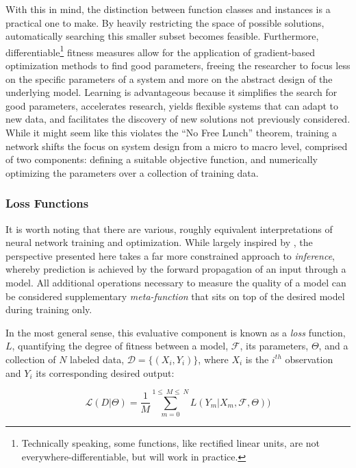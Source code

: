 With this in mind, the distinction between function classes and instances is a practical one to make.
By heavily restricting the space of possible solutions, automatically searching this smaller subset becomes feasible.
Furthermore, differentiable\footnote{Technically speaking, some functions, like rectified linear units, are not everywhere-differentiable, but will work in practice.} fitness measures allow for the application of gradient-based optimization methods to find good parameters, freeing the researcher to focus less on the specific parameters of a system and more on the abstract design of the underlying model.
Learning is advantageous because it simplifies the search for good parameters, accelerates research, yields flexible systems that can adapt to new data, and facilitates the discovery of new solutions not previously considered.
While it might seem like this violates the ``No Free Lunch'' theorem, training a network shifts the focus on system design from a micro to macro level, comprised of two components: defining a suitable objective function, and numerically optimizing the parameters over a collection of training data.


\subsubsection{Loss Functions}

It is worth noting that there are various, roughly equivalent interpretations of neural network training and optimization.
While largely inspired by \cite{LeCun2006Tutorial}, the perspective presented here takes a far more constrained approach to \emph{inference}, whereby prediction is achieved by the forward propagation of an input through a model.
All additional operations necessary to measure the quality of a model can be considered supplementary \emph{meta-function} that sits on top of the desired model during training only.

In the most general sense, this evaluative component is known as a \emph{loss} function, $L$, quantifying the degree of fitness between a model, $\mathcal{F}$, its parameters, $\Theta$, and a collection of $N$ labeled data, $\mathcal{D} = \{(X_i, Y_i) \}$, where $X_i$ is the $i^{th}$ observation and $Y_i$ its corresponding desired output:

\begin{equation}
\label{eq:genloss}
\mathcal{L}(D | \Theta) =  \frac{1}{M}\sum_{m=0}^{1\leq~M\leq~N}L(Y_m | X_m, \mathcal{F}, \Theta))
\end{equation}

